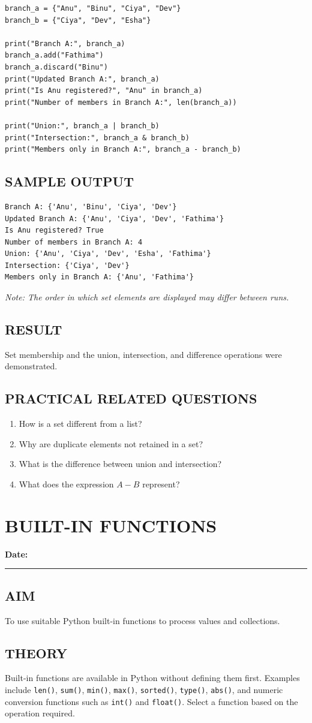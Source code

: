 \documentclass[12pt,a4paper]{report}
\newcommand{\experimentdate}{\hfill\textbf{Date:} \rule{3cm}{0.4pt}}
\newcommand{\aim}[1]{\section*{AIM}#1}
\newcommand{\result}[1]{\section*{RESULT}#1}
\newcommand{\questions}[1]{\section*{PRACTICAL RELATED QUESTIONS}#1}
\newcommand{\sampleoutput}{\section*{SAMPLE OUTPUT}}
\begin{document}
\begin{lstlisting}
branch_a = {"Anu", "Binu", "Ciya", "Dev"}
branch_b = {"Ciya", "Dev", "Esha"}

print("Branch A:", branch_a)
branch_a.add("Fathima")
branch_a.discard("Binu")
print("Updated Branch A:", branch_a)
print("Is Anu registered?", "Anu" in branch_a)
print("Number of members in Branch A:", len(branch_a))

print("Union:", branch_a | branch_b)
print("Intersection:", branch_a & branch_b)
print("Members only in Branch A:", branch_a - branch_b)
\end{lstlisting}

\sampleoutput
\begin{verbatim}
Branch A: {'Anu', 'Binu', 'Ciya', 'Dev'}
Updated Branch A: {'Anu', 'Ciya', 'Dev', 'Fathima'}
Is Anu registered? True
Number of members in Branch A: 4
Union: {'Anu', 'Ciya', 'Dev', 'Esha', 'Fathima'}
Intersection: {'Ciya', 'Dev'}
Members only in Branch A: {'Anu', 'Fathima'}
\end{verbatim}
\textit{Note: The order in which set elements are displayed may differ between runs.}

\result{Set membership and the union, intersection, and difference operations were demonstrated.}

\questions{
\begin{enumerate}
\item How is a set different from a list?
\item Why are duplicate elements not retained in a set?
\item What is the difference between union and intersection?
\item What does the expression \(A-B\) represent?
\end{enumerate}}

\chapter{BUILT-IN FUNCTIONS}
\experimentdate

\aim{To use suitable Python built-in functions to process values and collections.}

\section*{THEORY}
Built-in functions are available in Python without defining them first. Examples include
\texttt{len()}, \texttt{sum()}, \texttt{min()}, \texttt{max()}, \texttt{sorted()},
\texttt{type()}, \texttt{abs()}, and numeric conversion functions such as \texttt{int()}
and \texttt{float()}. Select a function based on the operation required.
\end{document}

